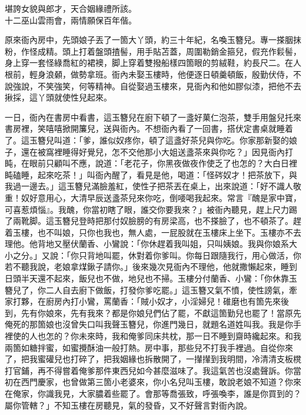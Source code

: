 \begin{myquote}
堪誇女貌與郎才，天合姻緣禮所該。\\十二巫山雲雨會，兩情願保百年偕。
\end{myquote}

原來衙內房中，先頭娘子丟了一箇大丫頭，約三十年紀，名喚玉簪兒。專一搽胭抹粉，作怪成精。頭上打着盤頭揸髻，用手貼苫蓋，周圍勒銷金箍兒，假充作鬏髻，{}身上穿一套怪綠喬紅的裙襖，脚上穿着雙撥船樣四箇眼的剪絨鞋，約長尺二。在人根前，輕身浪顙，做勢拿班。衙內未娶玉樓時，他便逐日頓羹頓飯，殷勤伏侍，不說強說，不笑強笑，何等精神。自從娶過玉樓來，見衙內和他如膠似漆，把他不去揪採，這丫頭就使性兒起來。

一日，衙內在書房中看書，這玉簪兒在廚下頓了一盞好菓仁泡茶，雙手用盤兒托來書房裡，笑嘻嘻掀開簾兒，送與衙內。不想衙內看了一回書，搭伏定書桌就睡着了。{}這玉簪兒叫道：「爹，誰似奴疼你，頓了這盞好茶兒與你吃。你家那新娶的娘子，還在被窩裡睡得好覺兒，怎不交他那小大姐送盞茶來與你吃？」因見衙內打盹，在眼前只顧叫不應，說道：「老花子，你黑夜做夜作使乏了也怎的？大白日裡盹磕睡，起來吃茶！」叫衙內醒了，看見是他，喝道：「怪硶奴才！把茶放下，與我過一邊去。」這玉簪兒滿臉羞紅，使性子把茶丟在桌上，出來說道：「好不識人敬重！奴好意用心，大清早辰送盞茶兒來你吃，倒喓喝我起來。常言『醜是家中寶，可喜惹煩惱』。我醜，你當初瞎了眼，誰交你要我來？」{}被衙內聽見，趕上尺力踢了兩靴脚。這玉簪兒登時把那付奴臉膀的有房梁高，也不搽臉了，也不頓茶了。趕着玉樓，也不叫娘，只你也我也，無人處，一屁股就在玉樓床上坐下。玉樓亦不去理他。他背地又壓伏蘭香、小鸞說：「你休趕着我叫姐，只叫姨娘。我與你娘系大小之分。」{}又說：「你只背地叫罷，休對着你爹叫。{}你每日跟隨我行，用心做活，你若不聽我說，老娘拿煤鍬子請你。」{}後來幾次見衙內不理他，他就撒懶起來，睡到日頭半天還不起來，飯兒也不做，地兒也不掃。玉樓分付蘭香、小鸞：「你休靠玉簪兒了，你二人自去廚下做飯，打發你爹吃罷。」這玉簪又氣不憤，使性謗氣，牽家打夥，在廚房內打小鸞，罵蘭香：「賊小奴才，小淫婦兒！碓磨也有箇先來後到，先有你娘來，先有我來？都是你娘兒們佔了罷，不獻這箇勤兒也罷了！當原先俺死的那箇娘也沒曾失口叫我聲玉簪兒，你進門幾日，就題名道姓叫我。我是你手裡使的人也怎的？你未來時，我和俺爹同床共枕，那一日不睡到齋時纔起來。和我兩箇如糖拌蜜，如蜜攪酥油一般打熱。房中事，那些兒不打我手裡過。自從你來了，把我蜜礶兒也打碎了，把我姻緣也拆散開了，一攆攆到我明間，冷清清支板櫈打官鋪，再不得嘗着俺爹那件東西兒如今甚麼滋味了。{}我這氣苦也沒處聲訴。你當初在西門慶家，也曾做第三箇小老婆來，你小名兒叫玉樓，敢說老娘不知道？{}你來在俺家，你識我見，大家膿着些罷了。會那等喬張致，呼張喚李，誰是你買到的？屬你管轄？」不知玉樓在房聽見，氣的發昏，又不好聲言對衙內說。

